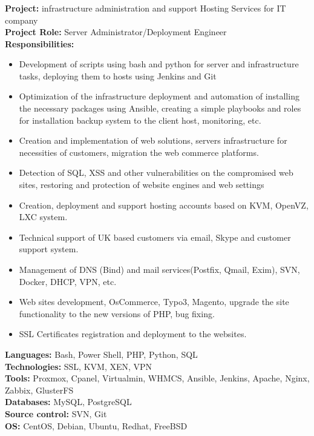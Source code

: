 \documentclass[letterpaper]{article}
\begin{document}
\subsubsection{}
\label{sec-2-1-1}
\textbf{Project:} infrastructure administration and support Hosting Services for IT company\\
\textbf{Project Role:}  Server Administrator/Deployment Engineer\\
\textbf{Responsibilities:}\\
\begin{itemize}
\item Development of scripts using bash and python for server and infrastructure tasks, deploying them to hosts using Jenkins and Git
\item Optimization of the infrastructure deployment and automation of installing the necessary packages using Ansible, creating a simple playbooks and roles for installation backup system to the client host, monitoring, etc.
\item Creation and implementation of web solutions, servers infrastructure for  necessities of customers, migration the web commerce platforms.
\item Detection of SQL, XSS and other vulnerabilities on the compromised web sites, restoring and protection of website engines and web settings
\item Creation, deployment and support hosting accounts based on KVM, OpenVZ, LXC system.
\item Technical support of UK based customers via email, Skype and customer support system.
\item Management of DNS (Bind) and mail services(Postfix, Qmail, Exim), SVN, Docker, DHCP, VPN, etc.
\item Web sites development, OsCommerce, Typo3, Magento, upgrade the site functionality to the new versions of PHP, bug fixing.
\item SSL Certificates registration and deployment to the websites.
\end{itemize}
\textbf{Languages:} Bash, Power Shell, PHP, Python,  SQL\\
\textbf{Technologies:} SSL, KVM, XEN, VPN\\
\textbf{Tools:} Proxmox, Cpanel, Virtualmin, WHMCS, Ansible, Jenkins, Apache, Nginx, Zabbix, GlusterFS\\
\textbf{Databases:} MySQL, PostgreSQL\\
\textbf{Source control:} SVN, Git\\
\textbf{OS:} CentOS, Debian, Ubuntu, Redhat, FreeBSD\\
\end{document}
